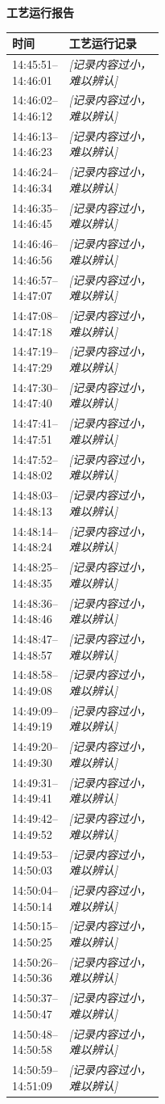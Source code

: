 \documentclass[UTF8,10pt,a4paper,fontset=fandol]{ctexart}
\begin{document}
\begin{minipage}[t]{0.48\textwidth}
\textbf{工艺运行报告}

\small
\begin{tabularx}{\linewidth}{|p{0.22\linewidth}|X|}
\hline
时间 & 工艺运行记录 \\
\hline
14:45:51--14:46:01 & \textit{[记录内容过小，难以辨认]} \\
14:46:02--14:46:12 & \textit{[记录内容过小，难以辨认]} \\
14:46:13--14:46:23 & \textit{[记录内容过小，难以辨认]} \\
14:46:24--14:46:34 & \textit{[记录内容过小，难以辨认]} \\
14:46:35--14:46:45 & \textit{[记录内容过小，难以辨认]} \\
14:46:46--14:46:56 & \textit{[记录内容过小，难以辨认]} \\
14:46:57--14:47:07 & \textit{[记录内容过小，难以辨认]} \\
14:47:08--14:47:18 & \textit{[记录内容过小，难以辨认]} \\
14:47:19--14:47:29 & \textit{[记录内容过小，难以辨认]} \\
14:47:30--14:47:40 & \textit{[记录内容过小，难以辨认]} \\
14:47:41--14:47:51 & \textit{[记录内容过小，难以辨认]} \\
14:47:52--14:48:02 & \textit{[记录内容过小，难以辨认]} \\
14:48:03--14:48:13 & \textit{[记录内容过小，难以辨认]} \\
14:48:14--14:48:24 & \textit{[记录内容过小，难以辨认]} \\
14:48:25--14:48:35 & \textit{[记录内容过小，难以辨认]} \\
14:48:36--14:48:46 & \textit{[记录内容过小，难以辨认]} \\
14:48:47--14:48:57 & \textit{[记录内容过小，难以辨认]} \\
14:48:58--14:49:08 & \textit{[记录内容过小，难以辨认]} \\
14:49:09--14:49:19 & \textit{[记录内容过小，难以辨认]} \\
14:49:20--14:49:30 & \textit{[记录内容过小，难以辨认]} \\
14:49:31--14:49:41 & \textit{[记录内容过小，难以辨认]} \\
14:49:42--14:49:52 & \textit{[记录内容过小，难以辨认]} \\
14:49:53--14:50:03 & \textit{[记录内容过小，难以辨认]} \\
14:50:04--14:50:14 & \textit{[记录内容过小，难以辨认]} \\
14:50:15--14:50:25 & \textit{[记录内容过小，难以辨认]} \\
14:50:26--14:50:36 & \textit{[记录内容过小，难以辨认]} \\
14:50:37--14:50:47 & \textit{[记录内容过小，难以辨认]} \\
14:50:48--14:50:58 & \textit{[记录内容过小，难以辨认]} \\
14:50:59--14:51:09 & \textit{[记录内容过小，难以辨认]} \\
\hline
\end{tabularx}
\end{minipage}
\end{document}
